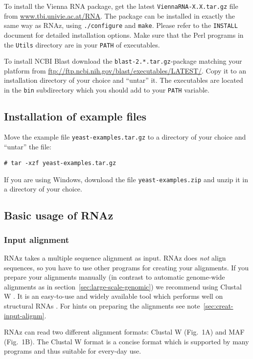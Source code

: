 \documentclass[11pt]{article}
\begin{document}
To install the Vienna RNA package, get the latest
\texttt{ViennaRNA-X.X.tar.gz} file from \url{www.tbi.univie.ac.at/RNA}. The
package can be installed in exactly the same way as RNAz, using
\texttt{./configure} and \texttt{make}. Please refer to the
\texttt{INSTALL} document for detailed installation options. Make sure that
the Perl programs in the \texttt{Utils} directory are in your \texttt{PATH}
of executables.

To install NCBI Blast download the \texttt{blast-2.*.tar.gz}-package
matching your platform from
\url{ftp://ftp.ncbi.nih.gov/blast/executables/LATEST/}. Copy it to an
installation directory of your choice and ``untar'' it. The executables are
located in the \texttt{bin} subdirectory which you should add to your
\texttt{PATH} variable.

\subsection{Installation of example files}

Move the example file \texttt{yeast-examples.tar.gz} to a directory of your
choice and ``untar'' the file:

\begin{verbatim}
# tar -xzf yeast-examples.tar.gz
\end{verbatim}

If you are using Windows, download the file \texttt{yeast-examples.zip} and
unzip it in a directory of your choice.

\subsection{Basic usage of RNAz}

\subsubsection{Input alignment}

RNAz takes a multiple sequence alignment as input. RNAz does \emph{not}
align sequences, so you have to use other programs for creating your
alignments. If you prepare your alignments manually (in contrast to
automatic genome-wide alignments as in
section~\ref{sec:large-scale-genomic}) we recommend using Clustal W
\cite{thompson94}. It is an easy-to-use and widely available tool which
performs well on structural RNAs \cite{gardner05}. For hints on preparing
the alignments see note~\ref{sec:creat-input-alignm}.

RNAz can read two different alignment formats: Clustal W
(Fig.~1A) and MAF (Fig.~1B). The Clustal W format is a
concise format which is supported by many programs and thus suitable for
every-day use. 
\end{document}
